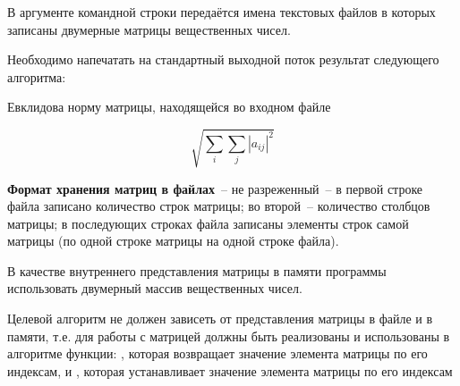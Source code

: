 
В аргументе командной строки передаётся имена текстовых файлов
в которых записаны двумерные матрицы
вещественных чисел.

Необходимо напечатать на стандартный выходной
поток результат следующего алгоритма:

Евклидова норму матрицы, находящейся во входном файле

$$
\sqrt{ \sum_i\sum_j{|a_{ij}|^2} }
$$

\textbf{Формат хранения матриц в файлах}~--
не разреженный~-- в первой строке файла записано количество строк
матрицы; во второй~-- количество столбцов матрицы; в последующих
строках файла записаны элементы строк самой матрицы (по одной
строке матрицы на одной строке файла).

В качестве внутреннего представления матрицы в памяти программы
использовать двумерный массив вещественных чисел.

Целевой алгоритм не
должен зависеть от представления матрицы в файле и в памяти, т.е. для
работы с матрицей должны быть реализованы и использованы в алгоритме
функции: , которая возвращает
значение элемента матрицы по его индексам, и , которая устанавливает значение элемента
матрицы по его индексам
